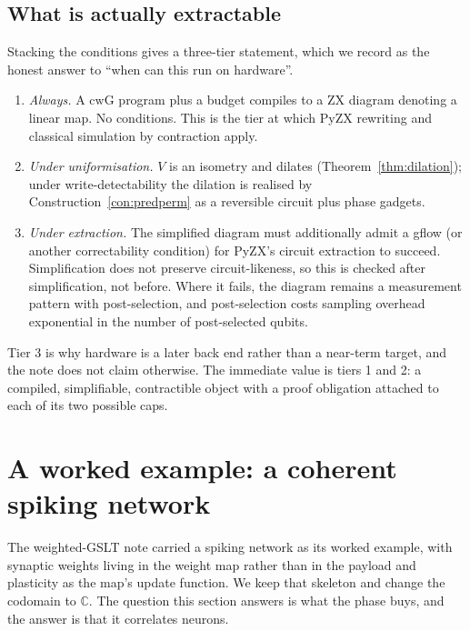 \documentclass[11pt]{article}
\theoremstyle{definition}
\theoremstyle{plain}
\newcommand{\cwG}{\mathrm{cwG}}
\begin{document}
\subsection{What is actually extractable}

Stacking the conditions gives a three-tier statement, which we record as the honest answer to
``when can this run on hardware''.

\begin{enumerate}[leftmargin=*]
  \item \emph{Always.} A $\cwG$ program plus a budget compiles to a ZX diagram denoting a linear
        map. No conditions. This is the tier at which PyZX rewriting and classical simulation by
        contraction apply.
  \item \emph{Under uniformisation.} $V$ is an isometry and dilates
        (Theorem~\ref{thm:dilation}); under write-detectability the dilation is realised by
        Construction~\ref{con:predperm} as a reversible circuit plus phase gadgets.
  \item \emph{Under extraction.} The simplified diagram must additionally admit a gflow (or
        another correctability condition) for PyZX's circuit extraction to succeed. Simplification
        does not preserve circuit-likeness, so this is checked after simplification, not before.
        Where it fails, the diagram remains a measurement pattern with post-selection, and
        post-selection costs sampling overhead exponential in the number of post-selected
        qubits.
\end{enumerate}

Tier 3 is why hardware is a later back end rather than a near-term target, and the note does not
claim otherwise. The immediate value is tiers 1 and 2: a compiled, simplifiable, contractible
object with a proof obligation attached to each of its two possible caps.

\section{A worked example: a coherent spiking network}\label{sec:network}

The weighted-GSLT note carried a spiking network as its worked example, with
synaptic weights living in the weight map rather than in the payload and
plasticity as the map's update function. We keep that skeleton and change the
codomain to $\mathbb{C}$. The question this section answers is what the phase
buys, and the answer is that it correlates neurons.
\end{document}
